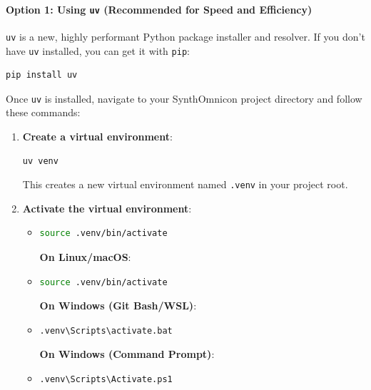 \documentclass[12pt,a4paper]{article}
\begin{document}
\paragraph{Option 1: Using \texttt{uv} (Recommended for Speed and Efficiency)}

\texttt{uv} is a new, highly performant Python package installer and resolver. If you don't have \texttt{uv} installed, you can get it with \texttt{pip}:

\begin{lstlisting}[language=bash]
pip install uv
\end{lstlisting}

Once \texttt{uv} is installed, navigate to your SynthOmnicon project directory and follow these commands:

\begin{enumerate}
    \item 
    \textbf{Create a virtual environment}:

    \begin{lstlisting}[language=bash]
uv venv
\end{lstlisting}

    This creates a new virtual environment named \texttt{.venv} in your project root.

    \item 
    \textbf{Activate the virtual environment}:

    \begin{itemize}
    \item 
    \begin{lstlisting}[language=bash]
source .venv/bin/activate
\end{lstlisting}

    \textbf{On Linux/macOS}:

    \item 
    \begin{lstlisting}[language=bash]
source .venv/bin/activate
\end{lstlisting}

    \textbf{On Windows (Git Bash/WSL)}:

    \item 
    \begin{lstlisting}[language=bash]
.venv\Scripts\activate.bat
\end{lstlisting}

    \textbf{On Windows (Command Prompt)}:

    \item 
    \begin{lstlisting}[language=bash]
.venv\Scripts\Activate.ps1
\end{lstlisting}


\end{itemize}
\end{enumerate}
\end{document}
